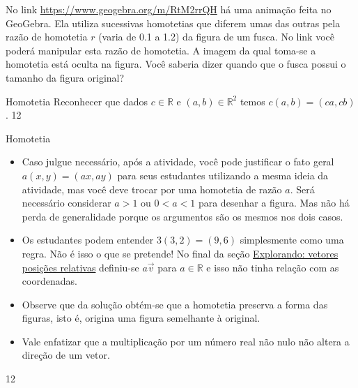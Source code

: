 No link \url{https://www.geogebra.org/m/RtM2rrQH} há uma animação feita no GeoGebra. Ela utiliza sucessivas homotetias que diferem umas das outras pela razão de homotetia \(r\) (varia de 0.1 a 1.2) da figura de um fusca. No link você poderá manipular esta razão de homotetia. A imagem da qual toma-se a homotetia está oculta na figura. Você saberia dizer quando que o fusca possui o tamanho da figura original?
\clearpage
\begin{objectives}{Homotetia}
{
Reconhecer que dados \(c\in \mathbb{R}\) e \((a,b) \in \mathbb{R}^2\) temos \(c(a,b)=(ca,cb)\).
}{1}{2}
\end{objectives}
\begin{sugestions}{Homotetia}
{
\begin{itemize}
\item {} 
Caso julgue necessário, após a atividade, você pode justificar o fato geral \(a(x,y)=(ax,ay)\) para seus estudantes utilizando a mesma ideia da atividade, mas você deve trocar por uma homotetia de razão \(a\). Será necessário considerar \(a>1\) ou \(0<a<1\) para desenhar a figura. Mas não há perda de generalidade porque os argumentos são os mesmos nos dois casos.

\item {} 
Os estudantes podem entender \(3(3,2)=(9,6)\) simplesmente como uma regra. Não é isso o que se pretende! No final da seção  \hyperref[vetores-exp1]{Explorando: vetores posições relativas} definiu-se \(a\vec{v}\) para \(a\in \mathbb{R}\) e isso não tinha relação com as coordenadas.

\item {} 
Observe que da solução obtém-se que a homotetia preserva a forma das figuras, isto é, origina uma figura semelhante à original.

\item {} 
Vale enfatizar que a multiplicação por um número real não nulo não altera a direção de um vetor.

\end{itemize}
}{1}{2}
\end{sugestions}
